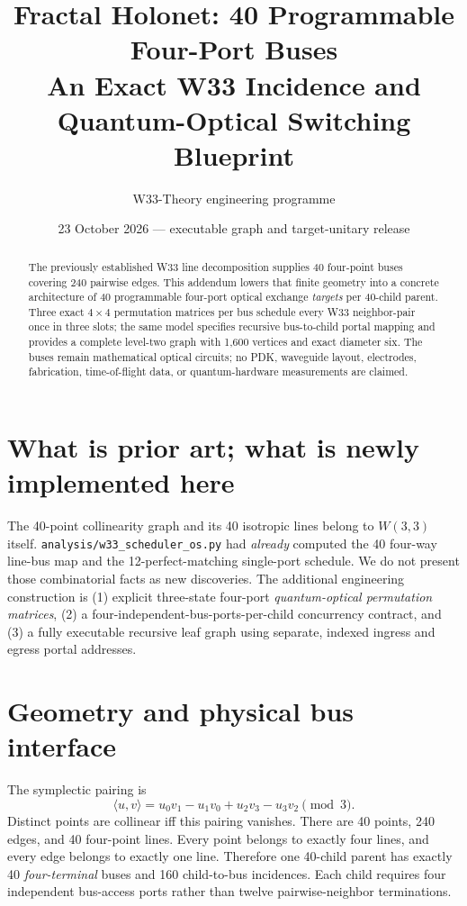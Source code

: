 \documentclass[10pt]{article}
\title{\textbf{Fractal Holonet: 40 Programmable Four-Port Buses}\\
An Exact W33 Incidence and Quantum-Optical Switching Blueprint}
\author{W33-Theory engineering programme}
\date{23 October 2026 --- executable graph and target-unitary release}
\begin{document}
\maketitle
\begin{abstract}
The previously established W33 line decomposition supplies 40 four-point
buses covering 240 pairwise edges. This addendum lowers that finite
geometry into a concrete architecture of 40 programmable four-port optical
exchange \emph{targets} per 40-child parent. Three exact $4\times4$
permutation matrices per bus schedule every W33 neighbor-pair once in
three slots; the same model specifies recursive bus-to-child portal
mapping and provides a complete level-two graph with 1,600 vertices and
exact diameter six. The buses remain mathematical optical circuits;
no PDK, waveguide layout, electrodes, fabrication, time-of-flight data,
or quantum-hardware measurements are claimed.
\end{abstract}
\tableofcontents
\section{What is prior art; what is newly implemented here}
The 40-point collinearity graph and its 40 isotropic lines belong to
$W(3,3)$ itself. \texttt{analysis/w33\_scheduler\_os.py} had
\emph{already} computed the 40 four-way line-bus map and the
12-perfect-matching single-port schedule. We do not present
those combinatorial facts as new discoveries.
The additional engineering construction is (1) explicit
three-state four-port \emph{quantum-optical permutation matrices},
(2) a four-independent-bus-ports-per-child concurrency
contract, and (3) a fully executable recursive leaf graph
using separate, indexed ingress and egress portal addresses.

\section{Geometry and physical bus interface}
The symplectic pairing is
\[
\langle u,v\rangle
=u_0v_1-u_1v_0+u_2v_3-u_3v_2\pmod3.
\]
Distinct points are collinear iff this pairing vanishes.
There are 40 points, 240 edges, and 40 four-point lines.
Every point belongs to exactly four lines, and every edge
belongs to exactly one line. Therefore one 40-child parent has
exactly 40 \emph{four-terminal} buses and 160 child-to-bus
incidences. Each child requires four independent bus-access ports
rather than twelve pairwise-neighbor terminations.
\end{document}
